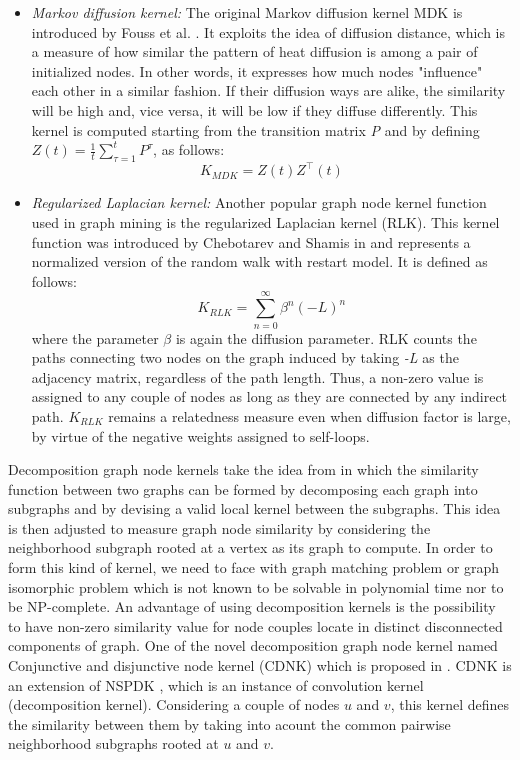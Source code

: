 \documentclass[runningheads,a4paper]{llncs}
\begin{document}
\begin{itemize}
\item \textit{Markov diffusion kernel:} The original Markov diffusion kernel MDK is introduced by Fouss et al. \cite{jour3}. It exploits the idea of diffusion distance, which is a measure of how similar the pattern of heat diffusion is among a pair of initialized nodes. In other words, it expresses how much nodes "influence" each other in a similar fashion. If their diffusion ways are alike, the similarity will be high and, vice versa, it will be low if they diffuse differently. This kernel is computed starting from the transition matrix \textit{P} and by defining $Z(t) = \frac{1}{t}\sum_{\tau=1}^{t} P^{\tau}$, as follows:
\begin{equation}
K_{MDK} = Z(t) Z^{\top}(t)
\end{equation}

\item \textit{Regularized Laplacian kernel:} Another popular graph node kernel function used in graph mining is the regularized Laplacian kernel (RLK). This kernel function was introduced by Chebotarev and Shamis in \cite{proceeding4} and represents a normalized version of the random walk with restart model. It is defined as follows:
\begin{equation}
K_{RLK} = \sum_{n=0}^{\infty}\beta^{n}(-L)^n
\end{equation}
where the parameter $\beta$ is again the diffusion parameter. RLK counts the paths connecting two nodes on the graph induced by taking \textit{-L} as the adjacency matrix, regardless of the path length. Thus, a non-zero value is assigned to any couple of nodes as long as they are connected by any indirect path. $K_{RLK}$ remains a relatedness measure even when diffusion factor is large, by virtue of the negative weights assigned to self-loops.
\end{itemize}
Decomposition graph node kernels take the idea from \cite{proceeding5} in which the similarity function between two graphs can be formed by decomposing each graph into subgraphs and by devising a valid local kernel between the subgraphs. This idea is then adjusted to measure graph node similarity by considering the neighborhood subgraph rooted at a vertex as its graph to compute. In order to form this kind of kernel, we need to face with graph matching problem or graph isomorphic problem which is not known to be solvable in polynomial time nor to be NP-complete. An advantage of using decomposition kernels is the possibility to have non-zero similarity value for node couples locate in distinct disconnected components of graph. One of the novel decomposition graph node kernel named Conjunctive and disjunctive node kernel (CDNK) which is proposed in \cite{proceeding6}. CDNK is an extension of NSPDK \cite{proceeding7}, which is an instance of convolution kernel (decomposition kernel). Considering a couple of nodes $u$ and $v$, this kernel defines the similarity between them by taking into acount the common pairwise neighborhood subgraphs rooted at $u$ and $v$.
\end{document}
